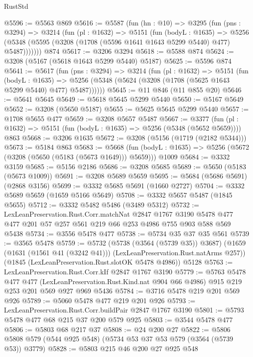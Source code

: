 \begin{lexlean}{RustStd}
\begin{coremodule}
@5596 := @5563 @869
@5616 := @5587
    (fun (hn : @10) =>
    @3295
      (fun (pns : @3294) =>
      @3214
        (fun (pl : @1632) =>
        @5151
          (fun (bodyL : @1635) =>
          @5256 (@5348 (@5595 (@3208 (@1708 (@5596 @1641 @1643 @5299 @5440) @477) @5487)))))))
    @874
@5617 := @3206 @3294
@5618 := @5588 @874
@5624 := @3208 (@5167 (@5618 @1643 @5299 @5440) @5187)
@5625 := @5596 @874
@5641 := @5617
    (fun (pns : @3294) =>
    @3214
      (fun (pl : @1632) =>
      @5151
        (fun (bodyL : @1635) =>
        @5256 (@5348 (@5624 (@3208 (@1708 (@5625 @1643 @5299 @5440) @477) @5487))))))
@5645 := @11 @846 (@11 @855 @20)
@5646 := @5641 @5645
@5649 := @5618 @5645 @5299 @5440
@5650 := @5167 @5649
@5652 := @3208 (@5650 @5187)
@5655 := @5625 @5645 @5299 @5440
@5657 := @1708 @5655 @477
@5659 := @3208 @5657 @5487
@5667 := @3377 (fun (pl : @1632) => @5151 (fun (bodyL : @1635) => @5256 (@5348 (@5652 @5659)))) @863
@5668 := @3206 @1635
@5672 := @3208 (@5156 (@1719 (@2182 @5344)))
@5673 := @5184 @863
@5683 := @5668
    (fun (bodyL : @1635) => @5256 (@5672 (@3208 (@5650 (@5183 (@5673 @1649))) @5659)))
    @1009
@5684 := @3332 @3159
@5685 := @5156 @2186
@5686 := @3208 @5685
@5689 := @5650 (@5183 (@5673 @1009))
@5691 := @3208 @5689 @5659
@5695 := @5684 (@5686 @5691) (@2868 @3156)
@5699 := @3332 @5685 @5691 (@1660 @2727)
@5704 := @3332 @5689 @5659 (@1659 @5166 @5649)
@5708 := @3332 @5657 @5487 (@1845 @5655)
@5712 := @3332 @5482 @5486 (@3489 @5312)
@5732 := LexLeanPreservation.Rust.Corr.matchNat
    @2847
    @1767
    @3190
    @5478
    @477
    @477
    @201
    @57
    @257
    @561
    @219
    @66
    @253
    @4986
    @755
    @903
    @588
    @569
    @5438
@5734 := @3556 @5478 @477
@5738 := @5734 @35 @37 @35 @561
@5739 := @3565 @5478
@5759 := @5732
    (@5738 (@3564 (@5739 @35)) @3687)
    (@1659 (@1631 (@1561 @41 (@3242 @41))) (LexLeanPreservation.Rust.natArms @257))
    (@1845 (LexLeanPreservation.Rust.slotOK @5478 @4986))
    @5128
@5763 := LexLeanPreservation.Rust.Corr.kIf @2847 @1767 @3190
@5779 := @5763
    @5478
    @477
    @477
    (LexLeanPreservation.Rust.Kind.nat @904 @66 @4986)
    @915
    @219
    @253
    @201
    @569
    @927
    @969
    @5436
@5784 := @3716 @5478 @219 @201 @569 @926
@5789 := @5060 @5478 @477 @219 @201 @926
@5793 := LexLeanPreservation.Rust.Corr.buildPair @2847 @1767 @3190
@5801 := @5793 @5478 @477 @68 @215 @37 @200 @579 @925
@5803 := @3544 @5478 @477
@5806 := @5803 @68 @217 @37
@5808 := @24 @200 @27
@5822 := @5806 @5808 @579 (@544 @925 @548) (@5734 @53 @37 @53 @579 (@3564 (@5739 @53)) @3779)
@5828 := @5803 @215 @46 @200 @27 @925 @548

\end{coremodule}
\end{lexlean}
